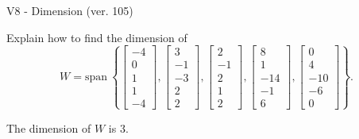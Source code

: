 \begin{exercise}
  \begin{exerciseTitle}V8 - Dimension (ver. 105)\end{exerciseTitle}
  \begin{exerciseStatement}
    Explain how to find the dimension of 
\[W=\mathrm{span}\ \left\{\left[\begin{array}{r}
-4 \\
0 \\
1 \\
1 \\
-4
\end{array}\right] , \left[\begin{array}{r}
3 \\
-1 \\
-3 \\
2 \\
2
\end{array}\right] , \left[\begin{array}{r}
2 \\
-1 \\
2 \\
1 \\
2
\end{array}\right] , \left[\begin{array}{r}
8 \\
1 \\
-14 \\
-1 \\
6
\end{array}\right] , \left[\begin{array}{r}
0 \\
4 \\
-10 \\
-6 \\
0
\end{array}\right]\right\}.\]



  \end{exerciseStatement}
  \begin{exerciseAnswer}
   The dimension of \(W\) is  \(3\).
  


  \end{exerciseAnswer}
\end{exercise}